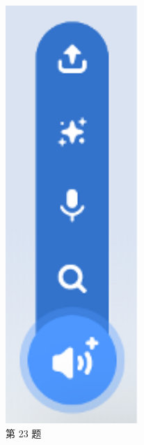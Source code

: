 \documentclass[10pt, a4paper]{article}
\begin{document}
\begin{enumerate}
\begin{figure}[htbp]
\begin{minipage}[t]{.1\textwidth}
                \includegraphics[width=0.45\textwidth]{23.png}
                \caption*{第 23 题}
            \end{minipage}
            \begin{minipage}[t]{.1\textwidth}
                \centering

\end{minipage}
\end{figure}
\end{enumerate}
\end{document}
